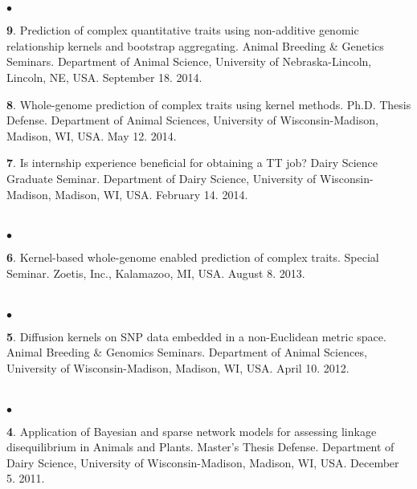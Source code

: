 \documentclass[margin,line,10pt]{res}
\newenvironment{list2}{
  \begin{list}{$\bullet$}{%
      \setlength{\itemsep}{0in}
      \setlength{\parsep}{0in} \setlength{\parskip}{0in}
      \setlength{\topsep}{0in} \setlength{\partopsep}{0in} 
      \setlength{\leftmargin}{0.2in}}}{\end{list}}
\begin{document}
\begin{resume}
\section{}
\begin{list2}
\item  [{\bf 9}.] Prediction of complex quantitative traits using non-additive genomic relationship kernels and bootstrap aggregating. Animal Breeding \& Genetics Seminars. Department of Animal Science, University of Nebraska-Lincoln, Lincoln, NE, USA. September 18. 2014. 
\vspace{0.5cm}

\item [{\bf 8}.] Whole-genome prediction of complex traits using kernel methods. Ph.D. Thesis Defense. Department of Animal Sciences, University of Wisconsin-Madison, Madison, WI, USA. May 12. 2014.
\vspace{0.5cm}

\item [{\bf 7}.] Is internship experience beneficial for obtaining a TT job? Dairy Science Graduate Seminar. Department of Dairy Science, University of Wisconsin-Madison, Madison, WI, USA. February 14. 2014.
\end{list2}  

\section{}
\begin{list2}
\item  [{\bf 6}.] Kernel-based whole-genome enabled prediction of complex traits. Special Seminar.  Zoetis, Inc., Kalamazoo, MI, USA. August 8. 2013.
\end{list2}  

\section{}
\begin{list2}
 \item [{\bf 5}.] Diffusion kernels on SNP data embedded in a non-Euclidean metric space. Animal Breeding \& Genomics Seminars.  Department of Animal Sciences, University of Wisconsin-Madison, Madison, WI, USA. April 10. 2012. 
\end{list2}  

\section{}
\begin{list2}
\item  [{\bf 4}.] Application of Bayesian and sparse network models for assessing linkage disequilibrium in Animals and Plants. Master's Thesis Defense.  Department of Dairy Science, University of Wisconsin-Madison, Madison, WI, USA. December 5. 2011. 
\end{list2}  


\end{resume}
\end{document}
